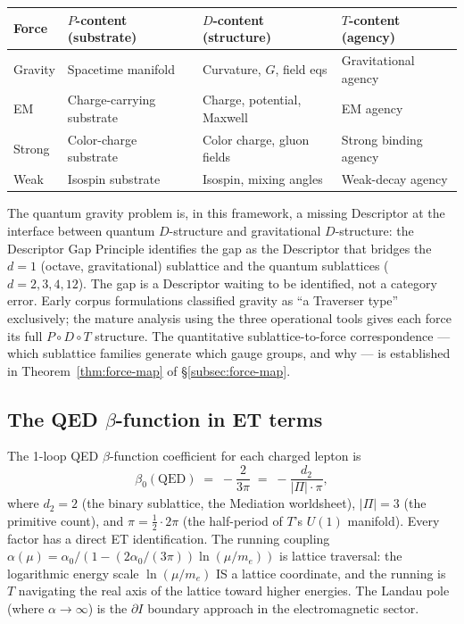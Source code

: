 \documentclass[11pt,a4paper]{article}
\theoremstyle{definition}
\theoremstyle{remark}
\begin{document}
\begin{center}
\small
\begin{tabular}{llll}
\toprule
\textbf{Force} & \textbf{$P$-content (substrate)} & \textbf{$D$-content (structure)} & \textbf{$T$-content (agency)} \\
\midrule
Gravity & Spacetime manifold & Curvature, $G$, field eqs & Gravitational agency \\
EM & Charge-carrying substrate & Charge, potential, Maxwell & EM agency \\
Strong & Color-charge substrate & Color charge, gluon fields & Strong binding agency \\
Weak & Isospin substrate & Isospin, mixing angles & Weak-decay agency \\
\bottomrule
\end{tabular}
\end{center}

The quantum gravity problem is, in this framework, a missing Descriptor at the interface between quantum $D$-structure and gravitational $D$-structure: the Descriptor Gap Principle identifies the gap as the Descriptor that bridges the $d = 1$ (octave, gravitational) sublattice and the quantum sublattices ($d = 2, 3, 4, 12$). The gap is a Descriptor waiting to be identified, not a category error. Early corpus formulations classified gravity as ``a Traverser type'' exclusively; the mature analysis using the three operational tools gives each force its full $P \circ D \circ T$ structure. The quantitative sublattice-to-force correspondence --- which sublattice families generate which gauge groups, and why --- is established in Theorem~\ref{thm:force-map} of \S\ref{subsec:force-map}.

\subsection{The QED $\beta$-function in ET terms}\label{subsec:QED-beta}

The 1-loop QED $\beta$-function coefficient for each charged lepton is
\[
\beta_{0}(\mathrm{QED}) \;=\; -\frac{2}{3\pi} \;=\; -\frac{d_{2}}{|\Pi| \cdot \pi},
\]
where $d_{2} = 2$ (the binary sublattice, the Mediation worldsheet), $|\Pi| = 3$ (the primitive count), and $\pi = \tfrac{1}{2} \cdot 2\pi$ (the half-period of $T$'s $U(1)$ manifold). Every factor has a direct ET identification. The running coupling $\alpha(\mu) = \alpha_{0}/(1 - (2\alpha_{0}/(3\pi))\ln(\mu/m_{e}))$ is lattice traversal: the logarithmic energy scale $\ln(\mu/m_{e})$ IS a lattice coordinate, and the running is $T$ navigating the real axis of the lattice toward higher energies. The Landau pole (where $\alpha \to \infty$) is the $\partial I$ boundary approach in the electromagnetic sector.
\end{document}
